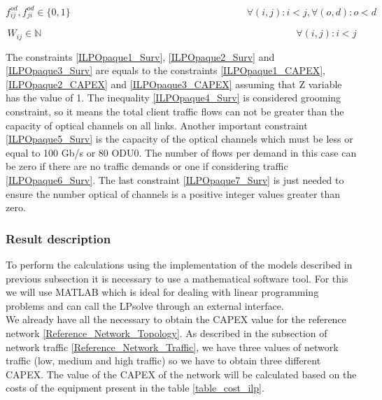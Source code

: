 \begin{equation}
f_{ij}^{od} , f_{ji}^{od} \in \{0,1\}   \qquad \qquad \qquad \qquad \qquad \qquad \qquad \qquad \qquad
\forall(i,j) : i < j, \forall(o,d) : o < d
\label{ILPOpaque6_Surv}
\end{equation}

\begin{equation}
W_{ij} \in \mathbb{N}  \qquad \qquad \qquad \qquad \qquad \qquad \qquad \qquad \qquad \qquad \qquad \qquad \qquad
\forall(i,j) : i < j
\label{ILPOpaque7_Surv}
\end{equation}

\vspace{10pt}

The constraints \ref{ILPOpaque1_Surv}, \ref{ILPOpaque2_Surv} and \ref{ILPOpaque3_Surv} are equals to the constraints \ref{ILPOpaque1_CAPEX}, \ref{ILPOpaque2_CAPEX} and \ref{ILPOpaque3_CAPEX} assuming that Z variable has the value of 1.
The inequality \ref{ILPOpaque4_Surv} is considered grooming constraint, so it means the total client traffic flows can not be greater than the capacity of optical channels on all links. Another important constraint \ref{ILPOpaque5_Surv} is the capacity of the optical channels which must be less or equal to 100 Gb/s or 80 ODU0. The number of flows per demand in this case can be zero if there are no traffic demands or one if considering traffic \ref{ILPOpaque6_Surv}. The last constraint \ref{ILPOpaque7_Surv} is just needed to ensure the number optical of channels is a positive integer values greater than zero.\\


\subsubsection{Result description}

To perform the calculations using the implementation of the models described in previous subsection it is necessary to use a mathematical software tool. For this we will use MATLAB which is ideal for dealing with linear programming problems and can call the LPsolve through an external interface. \\
We already have all the necessary to obtain the CAPEX value for the reference network \ref{Reference_Network_Topology}. As described in the subsection of network traffic \ref{Reference_Network_Traffic}, we have three values of network traffic (low, medium and high traffic) so we have to obtain three different CAPEX.
The value of the CAPEX of the network will be calculated based on the costs of the equipment present in the table \ref{table_cost_ilp}.

